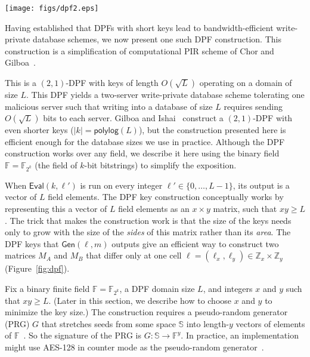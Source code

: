 \documentclass[10pt,twocolumn]{article}
\newcommand{\Z}{\mathbb{Z}}
\newcommand{\F}{\mathbb{F}}
\newcommand{\Seed}{\mathbb{S}}
\newcommand{\Gen}{\ensuremath{\mathsf{Gen}}\xspace}
\newcommand{\Eval}{\ensuremath{\mathsf{Eval}}\xspace}
\begin{document}
\begin{figure*}
\centering
\texttt{[image: figs/dpf2.eps]}
\caption{Left: We represent the 
output of $\Eval$ as an $x \times y$ matrix of field
elements.
Left-center: Construction of the ${\bf v}$ vector used
in the DPF keys.
Right: using the ${\bf v}$, ${\bf s}$, and ${\bf b}$ vectors,
$\Eval$ expands each of the two keys into an 
$x\times y$ matrix of field elements.
These two matrices sum to zero everywhere except 
at $(\ell_x,\ell_y) = (3,4)$, where they sum to $m$.
}
\label{fig:dpf}
\end{figure*}


Having established that DPFs with short keys lead to 
bandwidth-efficient write-private database schemes,
we now present one such DPF construction. 
This construction is a simplification of
computational PIR scheme of Chor and 
Gilboa~\cite{chor1997computationally}.

This is a $(2,1)$-DPF with keys of length $O(\sqrt{L})$
operating on a domain of size $L$.
This DPF yields a two-server write-private database scheme 
tolerating one malicious server such that writing into a database
of size $L$ requires sending $O(\sqrt{L})$ 
bits to each server.
Gilboa and Ishai~\cite{gilboa2014distributed} construct
a $(2,1)$-DPF with even shorter keys ($|k| = \mathsf{polylog}(L)$),
but the construction presented here is efficient enough for the database sizes
we use in practice.
Although the DPF construction works over any field, we
describe it here using the binary field $\F = \F_{2^k}$ 
(the field of $k$-bit bitstrings) to simplify the exposition.

When $\Eval(k, \ell')$ is run on every
integer $\ell' \in \{0, \dots, L-1\}$, 
its output is a vector of $L$ field elements.
The DPF key construction conceptually works by representing this
a vector of $L$ field elements
as an $x \times y$ matrix, such that $xy \geq L$.
The trick that makes the construction work is that the size of the keys
needs only to grow with the size of the {\em sides} of this matrix
rather than its {\em area}.
The DPF keys that $\Gen(\ell, m)$ outputs give an efficient
way to construct two matrices $M_A$ and $M_B$ that differ only 
at one cell $\ell = (\ell_x, \ell_y) \in \Z_x \times \Z_y$
(Figure~\ref{fig:dpf}).


Fix a binary finite field $\F = \F_{2^k}$, 
a DPF domain size $L$, and integers $x$ and $y$ such that $xy \geq L$.
(Later in this section, we describe how to 
choose $x$ and $y$ to minimize the key size.)
The construction requires a pseudo-random generator (PRG)
$G$ that stretches seeds from some space $\Seed$ 
into length-$y$ vectors of elements of $\F$~\cite{haastad1999pseudorandom}.
So the signature of the PRG is $G: \Seed \rightarrow \F^y$.
In practice, an implementation might use AES-128 
in counter mode as the pseudo-random generator~\cite{nist2001aes}.
\end{document}
